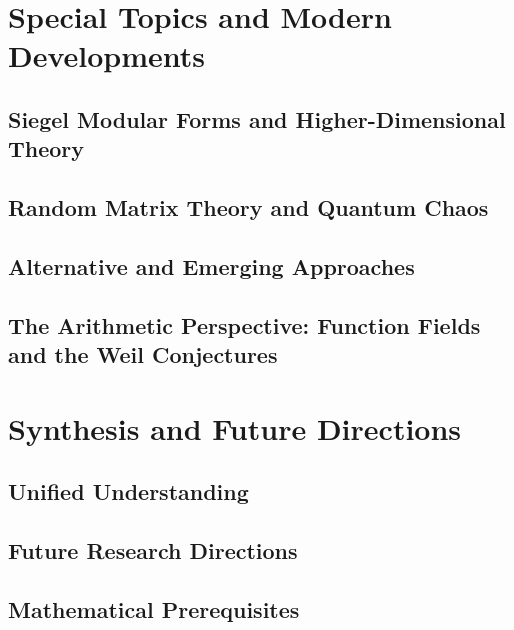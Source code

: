 \documentclass[12pt,a4paper,twoside]{book}
\theoremstyle{plain}
\theoremstyle{definition}
\theoremstyle{remark}
\begin{document}
\part{Special Topics and Modern Developments}

\chapter{Siegel Modular Forms and Higher-Dimensional Theory}
\label{ch:siegel}


\chapter{Random Matrix Theory and Quantum Chaos}
\label{ch:random_matrix}


\chapter{Alternative and Emerging Approaches}
\label{ch:alternative}


\chapter{The Arithmetic Perspective: Function Fields and the Weil Conjectures}
\label{ch:function_fields}


\part{Synthesis and Future Directions}

\chapter{Unified Understanding}
\label{ch:unified}


\chapter{Future Research Directions}
\label{ch:future}


\appendix

\chapter{Mathematical Prerequisites}
\label{app:prerequisites}

\end{document}
